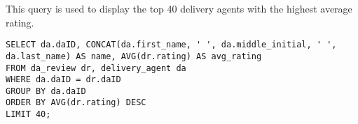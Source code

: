 This query is used to display the top 40 delivery agents with the highest average rating.

\begin{lstlisting}
SELECT da.daID, CONCAT(da.first_name, ' ', da.middle_initial, ' ', da.last_name) AS name, AVG(dr.rating) AS avg_rating
FROM da_review dr, delivery_agent da
WHERE da.daID = dr.daID
GROUP BY da.daID
ORDER BY AVG(dr.rating) DESC
LIMIT 40;
\end{lstlisting}